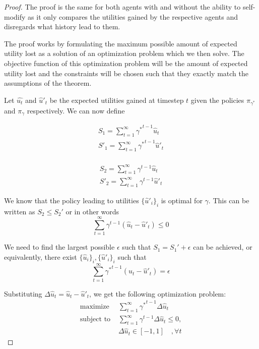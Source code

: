 \begin{proof}
The proof is the same for both agents with and without the ability to self-modify as it only compares the utilities gained by the respective agents and disregards what history lead to them.

The proof works by formulating the maximum possible amount of expected utility lost as a solution of an optimization problem which we then solve. The objective function of this optimization problem will be the amount of expected utility lost and the constraints will be chosen such that they exactly match the assumptions of the theorem.

Let $\hat{u_t}$ and $\hat{u}'_t$ be the expected utilities gained at timestep $t$ given the policies $\pi_{\gamma^*}$ and $\pi_{\gamma}$ respectively. We can now define
\begin{minipage}[t]{0.5\textwidth}
\begin{gather}
S_1 = \sum_{t=1}^\infty {\gamma^*}^{t-1} \hat{u}_t \\
S'_1 = \sum_{t=1}^\infty {\gamma^*}^{t-1} \hat{u}'_t \\
\end{gather}
\end{minipage}
\hspace{-3em}
\begin{minipage}[t]{0.5\textwidth}
\begin{gather}
S_2 = \sum_{t=1}^\infty \gamma^{t-1} \hat{u}_t \\
S'_2 = \sum_{t=1}^\infty \gamma^{t-1} \hat{u}'_t
\end{gather}
\end{minipage}

We know that the policy leading to utilities $\{\hat{u}'_i\}_i$ is optimal for $\gamma$. This can be written as $S_2 \leq S_2'$ or in other words
\[
\sum_{t=1}^\infty \gamma^{t-1} (\hat{u}_t - \hat{u}'_t) \leq 0
\]

We need to find the largest possible $\epsilon$ such that $S_1 = S_1' + \epsilon$ can be achieved, or equivalently, there exist $\{\hat{u}_i\}_i, \{\hat{u}'_i\}_i$ such that
\[
\sum_{t=1}^\infty {\gamma^*}^{t-1} (\hat{u}_t - \hat{u}'_t) = \epsilon
\]

Substituting $\Delta \hat{u}_t = \hat{u}_t - \hat{u}'_t$, we get the following optimization problem:
\begin{align}
\text{maximize }&\sum_{t=1}^\infty {\gamma^*}^{t-1} \Delta \hat{u}_t \\
\text{subject to }&\sum_{t=1}^\infty \gamma^{t-1} \Delta \hat{u}_t \leq 0, \\
&\Delta \hat{u}_t \in [-1, 1] \quad ,\forall t 
\end{align}


\end{proof}
